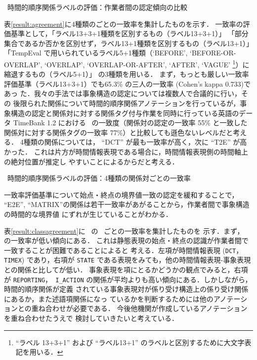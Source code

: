 \documentclass[japanese]{jnlp_1.4}
\newcommand{\modified}[1]{}
\def\tlink{}
\def\event{}
\def\klass{}
\begin{document}
\begin{table}[b]
\caption{\tlink\ 時間的順序関係ラベルの評価：作業者間の認定傾向の比較}
\label{result:order}

\end{table}

表\ref{result:agreement}に4種類の\modified{表現対}ごとの一致率を集計したものを示す．
一致率の評価基準として，「ラベル13+3+1種類を区別するもの（ラベル13+3+1）」
「部分集合であるか否かを区別せず，ラベル13+1種類を区別するもの（ラベル13+1）」
「TempEval で用いられているラベル5+1種類（`BEFORE', `BEFORE-OR-OVERLAP',
  `OVERLAP', `OVERLAP-OR-AFTER', `AFTER', `VAGUE' \footnote{``ラベル
  13+3+1'' および ``ラベル13+1'' のラベルと区別するために大文字表記を用いる．}）に縮退するもの（ラベル5+1）」
の3種類を用いる．
まず，もっとも厳しい一致率評価基準（ラベル13+3+1）でも65.3\% の三人の一致率
(Cohen's kappa 0.733)であっ
た．我々の手法では事象構造の認定については複数人で合議的に行い，その
後限られた関係について時間的順序関係アノテーションを行っているが，事象構造の認定と関係対に対する関係タグ付与作業を同時に行っている英語のデータ TimeBank 1.2 における \tlink\ の一致度（関係対の認定の一致率 55\% と一致した関係対に対する関係タグの一致率 77\%）と比較しても遜色ないレベルだと考える．
4種類の関係については， ``DCT'' が最も一致率が高く，次に ``T2E'' が高かった．
これは片方が時間情報表現である場合に，時間情報表現側の時間軸上の絶対位置が推定し
やすいことによるからだと考える．

\begin{table}[t]
\caption{\tlink\ 時間的順序関係ラベルの評価：4種類の関係対ごとの一致率}
\label{result:agreement}

\end{table}

一致率評価基準について始点・終点の境界値一致の認定を緩和することで， ``E2E'',
``MATRIX''の関係は若干一致率があがることから，作業者間で事象構造の時間的な境界値
にずれが生じていることがわかる．

表\ref{result:classagreement}に \event\ の \klass\ ごとの一致率を集計したものを
示す．まず，\modified{どちらかに静態表現である {\tt STATE}を含む表現対}
の\modified{作業者間ラベル}一致率が低い傾向にある．
これは静態表現の始点・終点の認識が作業者間で一致することが困難であることによると
考える．左項が時間情報表現 ({\tt DCT}，{\tt TIMEX}) であり，右項が {\tt STATE} である表現をみても，他の時間情報表現-事象表現との関係と比して\modified{作業者間ラベル一致率}が低い．
事象表現を項にとるかどうかの観点でみると，右項が {\tt REPORTING}，{\tt
I\_ACTION} の関係が平均よりも高い傾向にある．しかしながら，時間的順序関係が定義
されている事象表現対が係り受け構造上の係り受け関係にあるか，また述語項関係になっ
ているかを判断するためには他のアノテーションとの重ね合わせが必要である．
今後他機関が作成しているアノテーションを重ね合わせたうえで
検討していきたいと考えている．
\end{document}
